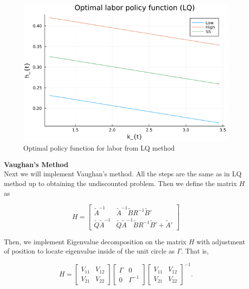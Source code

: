 \documentclass{article}
\begin{document}
	\begin{figure}[htbp]
		\centering
		\includegraphics[scale=0.5]{hpol_LQ.png}
		\caption{Optimal policy function for labor from LQ method}
	\end{figure}
	 
	 
	 
	 \noindent\textbf{\Large Vaughan's Method} \\
	 
	 Next we will implement Vaughan's method. All the steps are the same as in LQ method up to obtaining the undiscounted problem. Then we define the matrix $H$ as 
	 
	 $$H = \begin{bmatrix} \tilde{A}^{-1} & \tilde{A}^{-1}\tilde{B}R^{-1}\tilde{B}' \\ \tilde{Q}\tilde{A}^{-1} & \tilde{Q}\tilde{A}^{-1}\tilde{B}R^{-1}\tilde{B}' + \tilde{A}'  \end{bmatrix}$$
	 
	 Then, we implement Eigenvalue decomposition on the matrix $H$ with adjustment of position to locate eigenvalue inside of the unit circle as $\Gamma$. That is,
	 
	 $$H = \begin{bmatrix} V_{11} & V_{12}\\  V_{21} &  V_{22} \end{bmatrix} \begin{bmatrix} \Gamma & 0 \\  0 &  \Gamma^{-1} \end{bmatrix} \begin{bmatrix} V_{11} & V_{12}\\  V_{21} &  V_{22} \end{bmatrix}^{-1}.$$
	 
\end{document}

